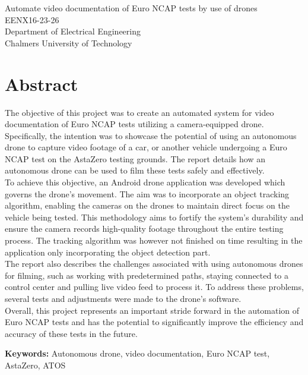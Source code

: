 Automate video documentation of Euro NCAP tests by use of drones\\
EENX16-23-26\\
Department of Electrical Engineering\\
Chalmers University of Technology \setlength{\parskip}{0.5cm}

\thispagestyle{empty}			%
\setlength{\parskip}{0pt plus 1.0pt}
\section*{Abstract}
The objective of this project was to create an automated system for video documentation of Euro NCAP tests utilizing a camera-equipped drone. Specifically, the intention was to showcase the potential of using an autonomous drone to capture video footage of a car, or another vehicle undergoing a Euro NCAP test on the AstaZero testing grounds. The report details how an autonomous drone can be used to film these tests safely and effectively. 
\\

To achieve this objective, an Android drone application was developed which governs the drone's movement. The aim was to incorporate an object tracking algorithm, enabling the cameras on the drones to maintain direct focus on the vehicle being tested. This methodology aims to fortify the system's durability and ensure the camera records high-quality footage throughout the entire testing process. The tracking algorithm was however not finished on time resulting in the application only incorporating the object detection part.  
\\

The report also describes the challenges associated with using autonomous drones for filming, such as working with predetermined paths, staying connected to a control center and pulling live video feed to process it. To address these problems, several tests and adjustments were made to the drone's software. 
\\

Overall, this project represents an important stride forward in the automation of Euro NCAP tests and has the potential to significantly improve the efficiency and accuracy of these tests in the future. 


\vfill
\textbf{Keywords:} Autonomous drone, video documentation, Euro NCAP test, AstaZero, ATOS

\mbox{}